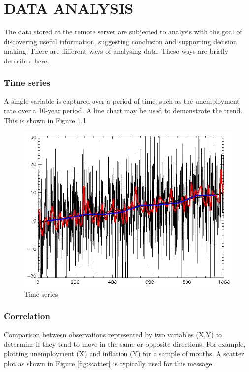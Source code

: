 \chapter{DATA ANALYSIS} %

The data stored at the remote server are subjected to analysis with the goal of discovering useful information, suggesting conclusion and supporting decision making. There are different ways of analysing data. These ways are briefly described here.

\subsection{Time series}
A single variable is captured over a period of time, such as the unemployment rate over a 10-year period. A line chart may be used to demonstrate the trend. This is shown in Figure \ref{fig:time}

\begin{figure}[h!]
	\centering
	\includegraphics[scale=0.3]{time}
	\caption{Time series}
	\label{fig:time}
\end{figure}

\subsection{Correlation}
Comparison between observations represented by two variables (X,Y) to determine if they tend to move in the same or opposite directions. For example, plotting unemployment (X) and inflation (Y) for a sample of months. A scatter plot as shown in Figure \ref{fig:scatter} is typically used for this message.

